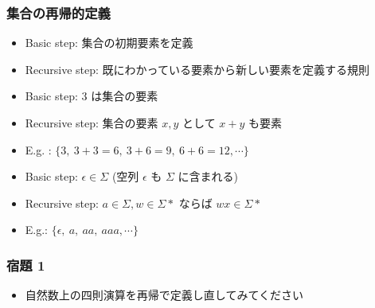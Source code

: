 \begin{frame}[fragile]
\frametitle{集合の再帰的定義}
  \begin{itemize}
\item Basic step: 集合の初期要素を定義
\item Recursive step: 既にわかっている要素から新しい要素を定義する規則
  \end{itemize}
  \begin{example}[3 の倍数]
    \begin{itemize}
\item Basic step: 3 は集合の要素
\item Recursive step: 集合の要素 \(x,y\) として \(x+y\) も要素
\item E.g. : \(\{3,\ 3+3=6,\ 3+6=9,\ 6+6=12,\cdots\}\)
    \end{itemize}
  \end{example}
  \begin{example}
    \begin{itemize}
\item Basic step: \(\epsilon\in\Sigma\) (空列 \(\epsilon\) も \(\Sigma\) に含まれる)
\item Recursive step: \(a\in\Sigma,w\in\Sigma*\) ならば \(wx\in\Sigma*\)
\item E.g.: \(\{\epsilon,\ a,\ aa,\ aaa,\cdots\}\)
    \end{itemize}
  \end{example}
\end{frame}
\begin{frame}[fragile]
\frametitle{宿題 1}
  \begin{itemize}
\item 自然数上の四則演算を再帰で定義し直してみてください
  \end{itemize}
\end{frame}
